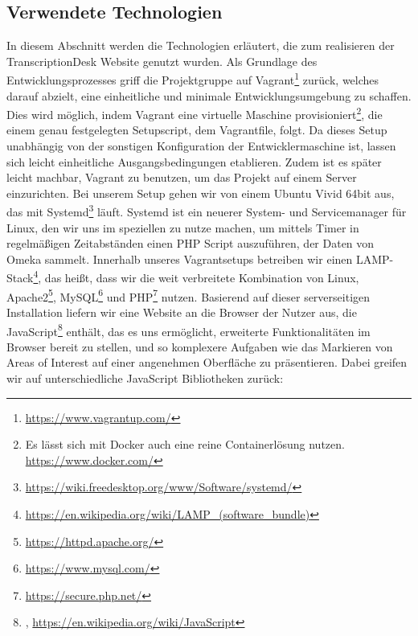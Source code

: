 \documentclass{article}
\begin{document}
\subsection{Verwendete Technologien}
In diesem Abschnitt werden die Technologien erläutert,
die zum realisieren der TranscriptionDesk Website genutzt wurden.
Als Grundlage des Entwicklungsprozesses griff die Projektgruppe auf Vagrant\footnote{
    \url{https://www.vagrantup.com/}}
zurück, welches darauf abzielt, eine einheitliche und minimale Entwicklungsumgebung zu schaffen.
Dies wird möglich, indem Vagrant eine virtuelle Maschine provisioniert\footnote{
    Es lässt sich mit Docker auch eine reine Containerlösung nutzen.\\
    \url{https://www.docker.com/}},
die einem genau festgelegten Setupscript, dem Vagrantfile, folgt.
Da dieses Setup unabhängig von der sonstigen Konfiguration der Entwicklermaschine ist,
lassen sich leicht einheitliche Ausgangsbedingungen etablieren.
Zudem ist es später leicht machbar, Vagrant zu benutzen,
um das Projekt auf einem Server einzurichten.
Bei unserem Setup gehen wir von einem Ubuntu Vivid 64bit aus,
das mit Systemd\footnote{
    \url{https://wiki.freedesktop.org/www/Software/systemd/}}
läuft. Systemd ist ein neuerer System- und Servicemanager für Linux,
den wir uns im speziellen zu nutze machen,
um mittels Timer in regelmäßigen Zeitabständen
einen PHP Script auszuführen,
der Daten von Omeka sammelt.
Innerhalb unseres Vagrantsetups betreiben wir einen LAMP-Stack\footnote{\url{https://en.wikipedia.org/wiki/LAMP_(software_bundle)}},
das heißt, dass wir die weit verbreitete Kombination von Linux, Apache2\footnote{
    \url{https://httpd.apache.org/}}, MySQL\footnote{
    \url{https://www.mysql.com/}} und PHP\footnote{
    \url{https://secure.php.net/}} nutzen.
Basierend auf dieser serverseitigen Installation liefern wir eine Website an die Browser der Nutzer aus,
die JavaScript\footnote{
    \cite{Flanagan},
    \url{https://en.wikipedia.org/wiki/JavaScript}} enthält, das es uns ermöglicht,
erweiterte Funktionalitäten im Browser bereit zu stellen,
und so komplexere Aufgaben wie das Markieren von Areas of Interest
auf einer angenehmen Oberfläche zu präsentieren.
Dabei greifen wir auf unterschiedliche JavaScript Bibliotheken zurück:
\end{document}
